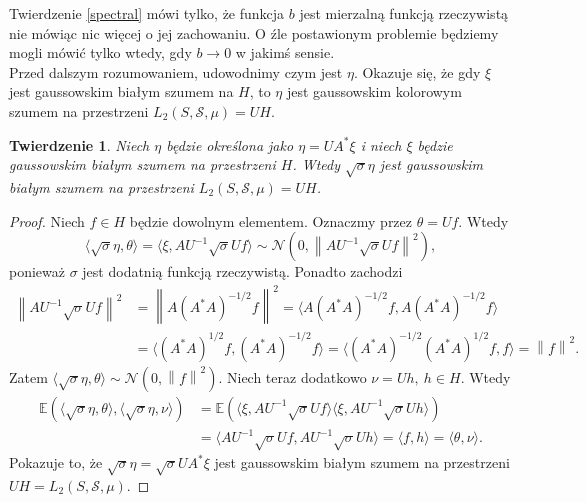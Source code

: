 \documentclass[man,mfiu]{mgrwms}
\newcommand{\norm}[1]{\left\lVert#1\right\rVert}
\newtheorem{tw}{Twierdzenie}[chapter]
\begin{document}
\indent Twierdzenie \ref{spectral} mówi tylko, że funkcja $b$ jest mierzalną funkcją rzeczywistą nie mówiąc nic więcej o jej zachowaniu. O źle postawionym problemie będziemy mogli mówić tylko wtedy, gdy $b\to 0$ w jakimś sensie.\\
\indent Przed dalszym rozumowaniem, udowodnimy czym jest $\eta$. Okazuje się, że gdy $\xi$ jest gaussowskim białym szumem na $H$, to $\eta$ jest gaussowskim kolorowym szumem na przestrzeni $L_2(S,\mathcal{S},\mu )=UH$.
\begin{tw}\label{whitenoise}
Niech $\eta$ będzie określona jako $\eta=UA^*\xi$ i niech $\xi$ będzie gaussowskim białym szumem na przestrzeni $H$. Wtedy $\sqrt{\sigma} \eta$  jest gaussowskim białym szumem na przestrzeni $L_2(S,\mathcal{S},\mu ) =UH$.
\end{tw}
\begin{proof}
Niech $f\in H$ będzie dowolnym elementem. Oznaczmy przez $\theta=Uf$. Wtedy 
\begin{displaymath}
\langle \sqrt{\sigma}\eta,\theta\rangle=\langle \xi, AU^{-1}\sqrt{\sigma}Uf\rangle\sim \mathcal{N}\left(0, \norm{AU^{-1}\sqrt{\sigma}Uf}^2\right),
\end{displaymath}
ponieważ $\sigma$ jest dodatnią funkcją rzeczywistą. Ponadto zachodzi
\begin{displaymath}
\begin{split}
\norm{AU^{-1}\sqrt{\sigma}Uf}^2&=\norm{A(A^*A)^{-1/2}f}^2=\langle A(A^*A)^{-1/2}f,A(A^*A)^{-1/2}f\rangle\\
&=\langle (A^*A)^{1/2}f,(A^*A)^{-1/2}f\rangle=\langle (A^*A)^{-1/2}(A^*A)^{1/2}f,f\rangle =\norm{f}^2.
\end{split}
\end{displaymath}
Zatem $\langle \sqrt{\sigma}\eta,\theta\rangle\sim \mathcal{N}(0,\norm{f}^2)$. Niech teraz dodatkowo $\nu=Uh, \ h\in H$. Wtedy
\begin{displaymath}
\begin{split}
\mathbb{E}\left(\langle\sqrt{\sigma}\eta,\theta\rangle,\langle\sqrt{\sigma}\eta,\nu\rangle\right)&=\mathbb{E}\left(\langle\xi,AU^{-1}\sqrt{\sigma}Uf \rangle\langle\xi,AU^{-1}\sqrt{\sigma}Uh\rangle\right)\\
&=\langle AU^{-1}\sqrt{\sigma}Uf,AU^{-1}\sqrt{\sigma}Uh\rangle=\langle f,h\rangle =\langle\theta,\nu\rangle.
\end{split}
\end{displaymath}
Pokazuje to, że $\sqrt{\sigma}\eta=\sqrt{\sigma}UA^*\xi$ jest gaussowskim białym szumem na przestrzeni $UH=L_2(S,\mathcal{S},\mu )$.
\end{proof}
\end{document}
